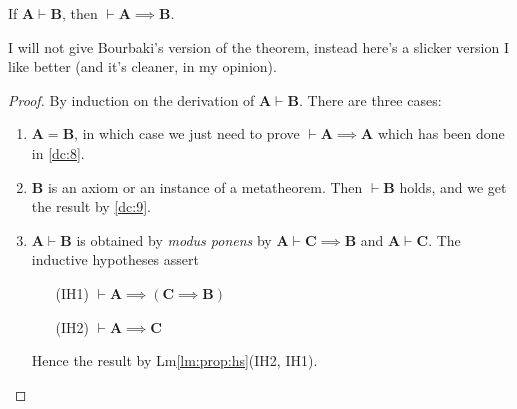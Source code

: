 \documentclass{amsart}%
\newcommand\metavariable[1]{\boldsymbol{#1}}
\begin{document}
\begin{dc}\label{dc:14}
If $\metavariable{A}\vdash\metavariable{B}$, then $\vdash\metavariable{A}\implies\metavariable{B}$.
\end{dc}

I will not give Bourbaki's version of the theorem, instead here's a
slicker version I like better (and it's cleaner, in my opinion).

\begin{proof}
By induction on the derivation of
$\metavariable{A}\vdash\metavariable{B}$. There are three cases:
\begin{enumerate}
\item $\metavariable{A}=\metavariable{B}$, in which case we just need to
  prove $\vdash\metavariable{A}\implies\metavariable{A}$ which has been
  done in \ref{dc:8}.
\item $\metavariable{B}$ is an axiom or an instance of a
  metatheorem. Then $\vdash\metavariable{B}$ holds, and we get the
  result by \ref{dc:9}.
\item $\metavariable{A}\vdash\metavariable{B}$ is obtained by
  \textit{modus ponens} by $\metavariable{A}\vdash\metavariable{C}\implies\metavariable{B}$
  and $\metavariable{A}\vdash\metavariable{C}$. The inductive hypotheses
  assert
  \begin{itemize}
  \item[(IH1)] $\vdash\metavariable{A}\implies(\metavariable{C}\implies\metavariable{B})$
  \item[(IH2)] $\vdash\metavariable{A}\implies\metavariable{C}$
  \end{itemize}
  Hence the result by Lm\ref{lm:prop:hs}(IH2, IH1).\qedhere

\end{enumerate}
\end{proof}
\end{document}
